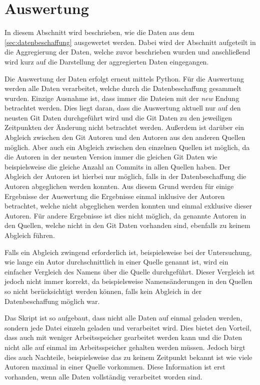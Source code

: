\section{Auswertung}
\label{sec:auswertung}
In diesem Abschnitt wird beschrieben, wie die Daten aus dem \autoref{sec:datenbeschaffung} ausgewertet werden.
Dabei wird der Abschnitt aufgeteilt in die Aggregierung der Daten, welche zuvor beschrieben wurden und anschließend wird kurz auf die Darstellung der aggregierten Daten eingegangen.

Die Auswertung der Daten erfolgt erneut mittels Python.
Für die Auswertung werden alle Daten verarbeitet, welche durch die Datenbeschaffung gesammelt wurden.
Einzige Ausnahme ist, dass immer die Dateien mit der \emph{new} Endung betrachtet werden.
Dies liegt daran, dass die Auswertung aktuell nur auf den neusten Git Daten durchgeführt wird und die Git Daten zu den jeweiligen Zeitpunkten der Änderung nicht betrachtet werden.
Außerdem ist darüber ein Abgleich zwischen den Git Autoren und den Autoren aus den anderen Quellen möglich.
Aber auch ein Abgleich zwischen den einzelnen Quellen ist möglich, da die Autoren in der neusten Version immer die gleichen Git Daten wie beispielsweise die gleiche Anzahl an Commits in allen Quellen haben.
Der Abgleich der Autoren ist hierbei nur möglich, falls in der Datenbeschaffung die Autoren abgeglichen werden konnten.
Aus diesem Grund werden für einige Ergebnisse der Auswertung die Ergebnisse einmal inklusive der Autoren betrachtet, welche nicht abgeglichen werden konnten und einmal exklusive dieser Autoren.
Für andere Ergebnisse ist dies nicht möglich, da genannte Autoren in den Quellen, welche nicht in den Git Daten vorhanden sind, ebenfalls zu keinem Abgleich führen.

Falls ein Abgleich zwingend erforderlich ist, beispielsweise bei der Untersuchung, wie lange ein Autor durchschnittlich in einer Quelle genannt ist, wird ein einfacher Vergleich des Namens über die Quelle durchgeführt.
Dieser Vergleich ist jedoch nicht immer korrekt, da beispielsweise Namensänderungen in den Quellen so nicht berücksichtigt werden können, falls kein Abgleich in der Datenbeschaffung möglich war.

Das Skript ist so aufgebaut, dass nicht alle Daten auf einmal geladen werden, sondern jede Datei einzeln geladen und verarbeitet wird.
Dies bietet den Vorteil, dass auch mit weniger Arbeitsspeicher gearbeitet werden kann und die Daten nicht alle auf einmal im Arbeitsspeicher gehalten werden müssen.
Jedoch birgt dies auch Nachteile, beispielsweise das zu keinem Zeitpunkt bekannt ist wie viele Autoren maximal in einer Quelle vorkommen.
Diese Information ist erst vorhanden, wenn alle Daten vollständig verarbeitet worden sind.

